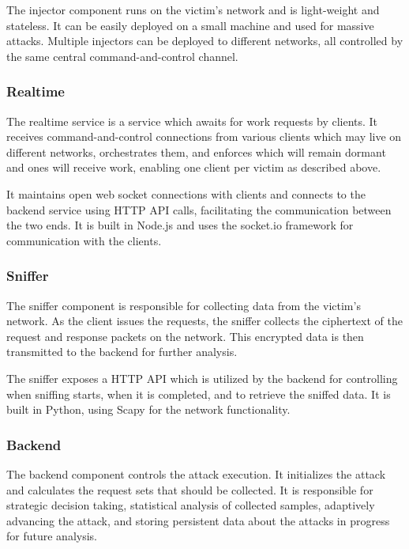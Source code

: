 The injector component runs on the victim's network and is light-weight and
stateless. It can be easily deployed on a small machine and used for massive
attacks. Multiple injectors can be deployed to different networks, all
controlled by the same central command-and-control channel.

\subsubsection{Realtime}

The realtime service is a service which awaits for work requests by clients. It
receives command-and-control connections from various clients which may live on
different networks, orchestrates them, and enforces which will remain dormant
and ones will receive work, enabling one client per victim as described above.

It maintains open web socket connections with clients and connects to the
backend service using HTTP API calls, facilitating the communication between the
two ends. It is built in Node.js and uses the socket.io framework for
communication with the clients.

\subsubsection{Sniffer}

The sniffer component is responsible for collecting data from the victim's
network. As the client issues the requests, the sniffer collects the ciphertext
of the request and response packets on the network. This encrypted data is then
transmitted to the backend for further analysis.

The sniffer exposes a HTTP API which is utilized by the backend for controlling
when sniffing starts, when it is completed, and to retrieve the sniffed data. It
is built in Python, using Scapy for the network functionality.

\subsubsection{Backend}

The backend component controls the attack execution. It initializes the attack
and calculates the request sets that should be collected. It is responsible for
strategic decision taking, statistical analysis of collected samples, adaptively
advancing the attack, and storing persistent data about the attacks in progress
for future analysis.

